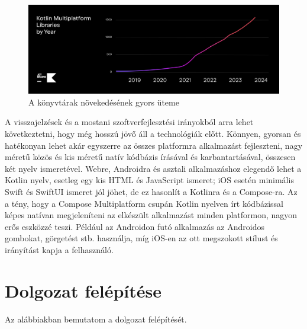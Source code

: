 \begin{figure}[!ht]
    \centering
    \includegraphics[width=150mm, keepaspectratio]{figures/Libraries-2800x995.png}
    \caption{A könyvtárak növekedésének gyors üteme \cite{KotlinMultiplatformStable}}
    \label{fig:KMPLibraries}
\end{figure}

A visszajelzések és a mostani szoftverfejlesztési irányokból arra lehet következtetni, hogy még hosszú jövő áll a technológiák előtt.
Könnyen, gyorsan és hatékonyan lehet akár egyszerre az összes platformra alkalmazást fejleszteni, nagy méretű közös és kis méretű natív kódbázis írásával és karbantartásával, összesen két nyelv ismeretével.
Webre, Androidra és asztali alkalmazáshoz elegendő lehet a Kotlin nyelv, esetleg egy kis HTML és JavaScript ismeret; iOS esetén minimális Swift és SwiftUI ismeret jól jöhet, de ez hasonlít a Kotlinra és a Compose-ra.
Az a tény, hogy a Compose Multiplatform csupán Kotlin nyelven írt kódbázissal képes natívan megjeleníteni az elkészült alkalmazást minden platformon, nagyon erős eszközzé teszi.
Például az Androidon futó alkalmazás az Androidos gombokat, görgetést stb. használja, míg iOS-en az ott megszokott stílust és irányítást kapja a felhasználó.

\section{Dolgozat felépítése}

Az alábbiakban bemutatom a dolgozat felépítését.

